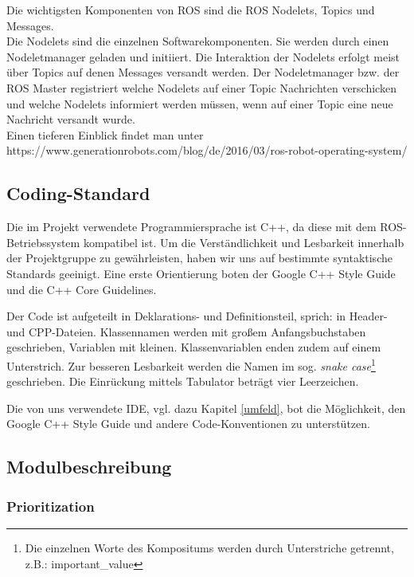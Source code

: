 \documentclass[a4paper, 12pt, titlepage]{scrartcl}
\begin{document}
		Die wichtigsten Komponenten von ROS sind die ROS Nodelets, Topics und Messages. \\

		Die Nodelets sind die einzelnen Softwarekomponenten. Sie werden durch einen Nodeletmanager geladen und initiiert. Die Interaktion der Nodelets erfolgt meist über Topics auf denen Messages versandt werden. Der Nodeletmanager bzw. der ROS Master registriert welche Nodelets auf einer Topic Nachrichten verschicken und welche Nodelets informiert werden müssen, wenn auf einer Topic eine neue Nachricht versandt wurde.\\

		Einen tieferen Einblick findet man unter\\
		https://www.generationrobots.com/blog/de/2016/03/ros-robot-operating-system/

		\subsection{Coding-Standard}
		\label{coding_standard}
			Die im Projekt verwendete Programmiersprache ist C++, da diese mit dem ROS-Betriebssystem kompatibel ist.
			Um die Verständlichkeit und Lesbarkeit innerhalb der Projektgruppe zu gewährleisten, haben wir uns auf
			bestimmte syntaktische Standards geeinigt. Eine erste Orientierung boten der Google C++ Style Guide\cite{googleTest} und die C++ Core Guidelines\cite{cppCoreGuide}.

			Der Code ist aufgeteilt in Deklarations- und Definitionsteil, sprich: in Header- und CPP-Dateien.
			Klassennamen werden mit großem Anfangsbuchstaben geschrieben, Variablen mit kleinen. Klassenvariablen enden zudem
			auf einem Unterstrich. Zur besseren Lesbarkeit werden die Namen im sog. \emph{snake case}\footnote{Die einzelnen
			Worte des Kompositums werden durch Unterstriche getrennt, z.B.: important\_value} geschrieben.
			Die Einrückung mittels Tabulator beträgt vier Leerzeichen.

			Die von uns verwendete IDE, vgl. dazu Kapitel \ref{umfeld}, bot die Möglichkeit, den Google C++ Style Guide und andere Code-Konventionen zu unterstützen.

		\subsection{Modulbeschreibung}
		\label{modulbeschreibung}
			\subsubsection{Prioritization}
			\label{prioritization}
\end{document}
